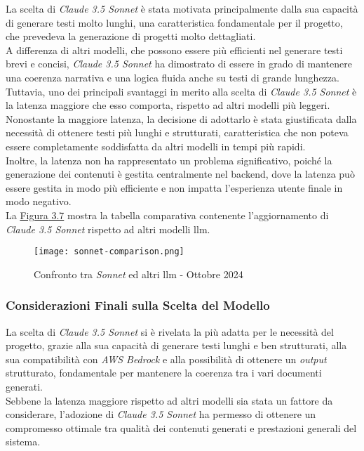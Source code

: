 \noindent La scelta di \textit{Claude 3.5 Sonnet} è stata motivata principalmente dalla sua capacità di generare testi molto lunghi, una caratteristica fondamentale per il progetto, che prevedeva la generazione di progetti molto dettagliati.\\
A differenza di altri modelli, che possono essere più efficienti nel generare testi brevi e concisi, \textit{Claude 3.5 Sonnet} ha dimostrato di essere in grado di mantenere una coerenza narrativa e una logica fluida anche su testi di grande lunghezza.\\

\noindent Tuttavia, uno dei principali svantaggi in merito alla scelta di \textit{Claude 3.5 Sonnet} è la latenza maggiore che esso comporta, rispetto ad altri modelli più leggeri.\\
Nonostante la maggiore latenza, la decisione di adottarlo è stata giustificata dalla necessità di ottenere testi più lunghi e strutturati, caratteristica che non poteva essere completamente soddisfatta da altri modelli in tempi più rapidi.\\
Inoltre, la latenza non ha rappresentato un problema significativo, poiché la generazione dei contenuti è gestita centralmente nel \gls{backend}, dove la latenza può essere gestita in modo più efficiente e non impatta l'esperienza utente finale in modo negativo.\\

\noindent La {\hyperref[fig:sonnet-comparison]{Figura 3.7}} mostra la tabella comparativa contenente l'aggiornamento di \textit{Claude 3.5 Sonnet} rispetto ad altri modelli \gls{llm}.

\begin{figure}[H]
    \centering
    \texttt{[image: sonnet-comparison.png]}
    \caption{Confronto tra \textit{Sonnet} ed altri \gls{llm} - Ottobre 2024}
    \cite{site:updated-sonnet}
    \label{fig:sonnet-comparison}
\end{figure}



\subsubsection{Considerazioni Finali sulla Scelta del Modello}

La scelta di \textit{Claude 3.5 Sonnet} si è rivelata la più adatta per le necessità del progetto, grazie alla sua capacità di generare testi lunghi e ben strutturati, alla sua compatibilità con \textit{AWS Bedrock} e alla possibilità di ottenere un \textit{output} strutturato, fondamentale per mantenere la coerenza tra i vari documenti generati. \\
Sebbene la latenza maggiore rispetto ad altri modelli sia stata un fattore da considerare, l'adozione di \textit{Claude 3.5 Sonnet} ha permesso di ottenere un compromesso ottimale tra qualità dei contenuti generati e prestazioni generali del sistema.
